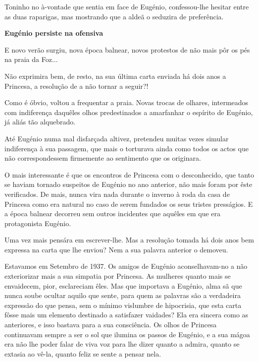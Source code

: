 \documentclass[9pt]{article}
\begin{document}
Toninho no à-vontade que sentia em face de Eugé\-nio, confessou-\-lhe hesitar entre as duas raparigas, mas mostrando que a aldeã o seduzira de preferência.

\newpage %

\begin{center}\bf\large Eugé\-nio persiste na ofensiva\end{center}

E novo verão surgiu, nova época balnear, novos protestos de
não mais pôr os pés na praia da Foz...

Não exprimira bem, de resto, na sua última carta enviada há dois anos a Princesa, a resolu\-ção de a não tornar a seguir?!

Como é óbvio, voltou a frequentar a praia. Novas trocas de o\-lhares, intermeados com indiferença daquêles o\-lhos predestinados a amarfanhar o espírito de Eugé\-nio, já aliás tão alquebrado.

Até Eugé\-nio numa mal dis\-far\-ça\-da altivez, pretendeu muitas vezes simular indiferença à sua passagem, que mais o torturava ainda como todos
os actos que não correspondessem firmemente ao sentimento que os originara.

O mais interessante é que os encontros de Princesa com o desconhecido, que
tanto se haviam tornado suspeitos de Eugé\-nio no ano anterior, não mais
foram por êste verifi\-cados. De mais, nunca vira nada durante o inverno à roda
da casa de Princesa como era natural no caso de serem fundados os seus
tristes presságios. E a época balnear decorreu sem outros incidentes que
a\-quê\-les em que era protagonista Eugé\-nio.

Uma vez mais pensára em escrever-\-lhe. Mas a resolu\-ção tomada há
dois anos bem expressa na carta que lhe enviou? Nem a sua palavra anterior o demoveu.

Estavamos em Setembro de 1937. Os amigos de Eugé\-nio aconse\-lhavam-no a não exteriorizar mais a sua simpatia por Princesa. As mu\-lheres
quanto mais se envaidecem, pior, esclareciam êles. Mas que importava a
Eugé\-nio, alma sã que nunca soube ocultar aquilo que sente, para quem
as palavras são a verdadeira ex\-pres\-são do que pensa, sem o mí\-ni\-mo vislumbre de hipocrisia, que esta carta fôsse mais um elemento destinado
a satisfazer vaidades? Ela era sincera como as anteriores, e isso
bastava para a sua consciência. Os o\-lhos de Princesa continuavam sempre a ser o sol que ilumina os passos de Eugé\-nio, e a sua mágoa era
não lhe poder falar de viva voz para lhe dizer quanto a admira, quanto
se extasia ao vê-la, quanto feliz se sente a pensar nela.
\end{document}
